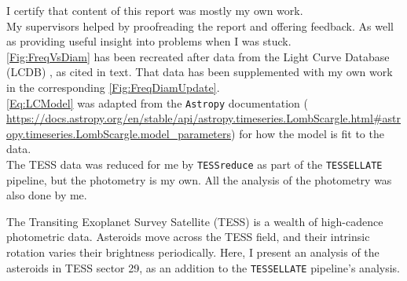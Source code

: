 \documentclass{UCreport}
\begin{document}




\buildmargins %
\buildcover %



\declaration

I certify that content of this report was mostly my own work.
\\

My supervisors helped by proofreading the report and offering feedback. As well as providing useful insight into problems when I was stuck.\\

\autoref{Fig:FreqVsDiam} has been recreated after data from the Light Curve Database (LCDB) \citet{Warner2009}, as cited in text. That data has been supplemented with my own work in the corresponding \autoref{Fig:FreqDiamUpdate}.\\

\autoref{Eq:LCModel} was adapted from the \texttt{Astropy} documentation
\citep{Astropy2022} ( \url{https://docs.astropy.org/en/stable/api/astropy.timeseries.LombScargle.html#astropy.timeseries.LombScargle.model_parameters}) for how the model is fit to the data. \\

The TESS data was reduced for me by \texttt{TESSreduce} as part of the \texttt{TESSELLATE} pipeline, but the photometry is my own.
All the analysis of the photometry was also done by me. 

\vspace{2cm}
\begin{centering}
  \textbf{\student}\par
\end{centering}

\newpage


\abstract

The Transiting Exoplanet Survey Satellite (TESS) is a wealth of high-cadence photometric data. 
Asteroids move across the TESS field, and their intrinsic rotation varies their brightness periodically. 
Here, I present an analysis of the asteroids in TESS sector 29, as an addition to the \texttt{TESSELLATE} pipeline's analysis.
\end{document}
